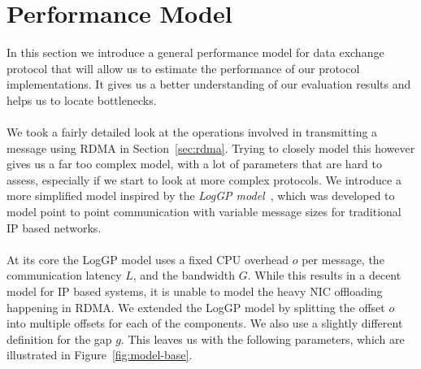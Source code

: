 \section{Performance Model}\label{sec:perf-model} \label{sec:model}
In this section we introduce a general performance model for data exchange protocol that will allow us to estimate the 
performance of our protocol implementations. It gives us a better understanding of our evaluation results and helps us 
to locate bottlenecks.

\paragraph{}We took a fairly detailed look at the operations involved in transmitting a message using RDMA in Section~\ref{sec:rdma}.
Trying to closely model this however gives us a far too complex model, with a lot of parameters that are hard to assess,
especially if we start to look at more complex protocols. We introduce a more simplified model inspired by the  
\emph{LogGP model}~\cite{loggp}, which was developed  to model point to point communication with variable message sizes for 
traditional IP based networks.

\paragraph{} At its core the LogGP model uses a fixed CPU overhead $o$ per message, the communication latency $L$, and 
the bandwidth $G$. While this results in a decent model for IP based systems, it is unable to model the heavy NIC offloading 
happening in RDMA. We extended the LogGP model by splitting the offset $o$ into multiple offsets for each of the components.
We also use a slightly different definition for the gap $g$. This leaves 
us with the following parameters, which are illustrated in Figure~\ref{fig:model-base}.

